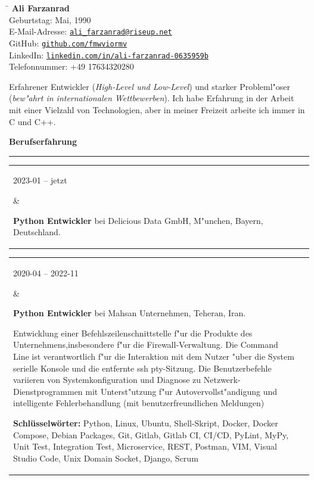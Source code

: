 \documentclass[11pt,a4paper,oneside]{article}
\makeatletter
\newcommand{\https}[1]{\href{https://#1}{\nolinkurl{#1}}}
\newcommand{\mailto}[1]{\href{mailto://#1}{\nolinkurl{#1}}}
\newcommand{\keywords}[1]{\textbf{Schl\"{u}sselw\"{o}rter:} #1}
\renewcommand{\section}[1]{%
{\large\textbf{#1}}\\
\rule[9pt]{18cm}{.4pt}\vspace{-16pt}%
}
\newenvironment{mytable}{%
\begin{tabular}{@{}l@{\hspace{4mm}}l@{}}%
}{\end{tabular}}
\newcommand{\myitem}[2]{%
\parbox[t]{16mm}{#1}&\parbox[t]{16cm}{#2}\\%
}
\makeatother
\begin{document}
%
%
\hspace{1cm}%
\parbox{13cm}{%
\begin{tabbing}%
\hspace{3cm}\=\kill%
\textbf{{\LARGE Ali Farzanrad}}\\[5mm]
Geburtstag:  Mai, 1990\\[1mm]
E-Mail-Adresse: \>
\mailto{ali_farzanrad@riseup.net}\\[1mm]
GitHub: \>
\https{github.com/fmwviormv}\\[1mm]
LinkedIn: \>
\https{linkedin.com/in/ali-farzanrad-0635959b}\\[1mm]
Telefonnummer: \>
{+}49{ }17634320280\\
\end{tabbing}%
}

\vspace{-9pt}%
Erfahrener Entwickler (\textit{High-Level und Low-Level}) und starker
Probleml"oser (\textit{bew"ahrt in internationalen Wettbewerben}).
Ich habe Erfahrung in der Arbeit mit einer Vielzahl von Technologien,
aber in meiner Freizeit arbeite ich immer in C und C++.

\section{Berufserfahrung}

\begin{mytable}
\myitem{2023-01 -- jetzt}{%
\textbf{Python Entwickler} bei
Delicious Data GmbH, M"unchen, Bayern, Deutschland.
}
\end{mytable}

\begin{mytable}
\myitem{2020-04 -- 2022-11}{%
\textbf{Python Entwickler} bei
Mahsan Unternehmen, Teheran, Iran.

Entwicklung einer Befehlszeilenschnittstelle f"ur die Produkte
des Unternehmens,insbesondere f"ur die Firewall-Verwaltung.
Die Command Line ist verantwortlich f"ur die Interaktion mit dem Nutzer
"uber die System serielle Konsole und die entfernte ssh pty-Sitzung.
Die Benutzerbefehle variieren von Systemkonfiguration und Diagnose
zu Netzwerk-Dienstprogrammen mit Unterst"utzung
f"ur Autovervollst"andigung und intelligente Fehlerbehandlung
(mit benutzerfreundlichen Meldungen)

\keywords{%
	Python, Linux, Ubuntu, Shell-Skript, Docker, Docker Compose,
	Debian Packages, Git, Gitlab, Gitlab CI, CI/CD, PyLint, MyPy,
	Unit Test, Integration Test, Microservice, REST, Postman,
	VIM, Visual Studio Code, Unix Domain Socket, Django, Scrum
}
}
\end{mytable}
\end{document}

